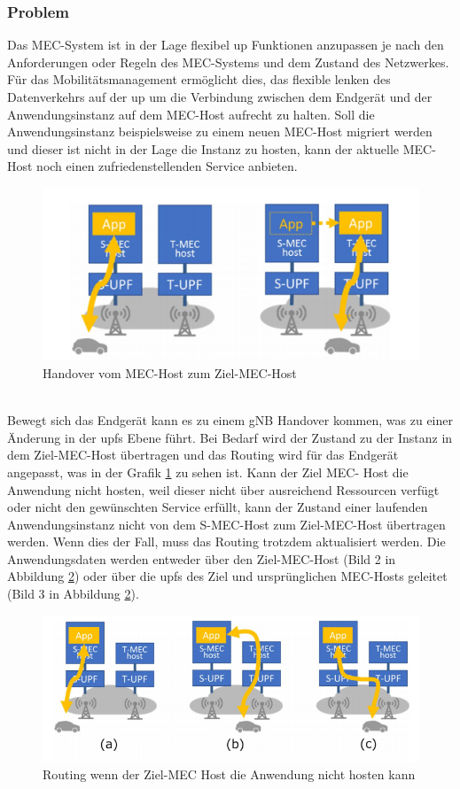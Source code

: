 \documentclass[runningheads]{llncs}
\numberwithin{figure}{section}
\begin{document}
\subsubsection{Problem}
Das MEC-System ist in der Lage flexibel \acrlong{up} Funktionen anzupassen je nach den Anforderungen oder Regeln des MEC-Systems 
und dem Zustand des Netzwerkes. Für das Mobilitätsmanagement ermöglicht dies, das flexible lenken des Datenverkehrs auf der \acrshort{up}
um die Verbindung zwischen dem Endgerät und der Anwendungsinstanz auf dem MEC-Host aufrecht zu halten. Soll die Anwendungsinstanz
beispielsweise zu einem neuen MEC-Host migriert werden und dieser ist nicht in der Lage die Instanz zu hosten, kann der aktuelle
MEC-Host noch einen zufriedenstellenden Service anbieten.
\begin{figure}
  \includegraphics[width=\linewidth]{images/Verschieben_Instanz.png}
  \caption{Handover vom MEC-Host zum Ziel-MEC-Host}
  \label{fig:Verschieben_Instanz}
\end{figure}
\\
Bewegt sich das Endgerät kann es zu einem gNB Handover kommen, was zu einer Änderung in der \acrshort{upf}s Ebene führt. 
Bei Bedarf wird der Zustand zu der Instanz in dem Ziel-MEC-Host übertragen und das Routing wird für das Endgerät angepasst, 
was in der Grafik \ref{fig:Verschieben_Instanz} zu sehen ist.
Kann der Ziel MEC- Host die Anwendung nicht hosten, weil dieser nicht über ausreichend Ressourcen verfügt oder nicht den gewünschten Service
erfüllt, kann der Zustand einer laufenden Anwendungsinstanz nicht von dem S-MEC-Host zum Ziel-MEC-Host übertragen werden. 
Wenn dies der Fall, muss das Routing
trotzdem aktualisiert werden. Die Anwendungsdaten werden entweder über den Ziel-MEC-Host (Bild 2 in Abbildung \ref{fig:mecerror}) 
oder über die \acrshort{upf}s des Ziel und ursprünglichen MEC-Hosts geleitet (Bild 3 in Abbildung \ref{fig:mecerror}).
\begin{figure}
  \includegraphics[width=\linewidth]{images/MEC_host_Error.png}
  \caption{Routing wenn der Ziel-MEC Host die Anwendung nicht hosten kann}
  \label{fig:mecerror}
\end{figure}
\end{document}
